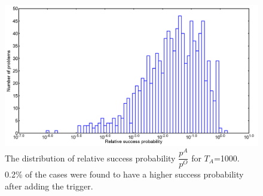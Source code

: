\documentclass[../main.tex]{subfiles}
\begin{document}
\begin{figure}[H]
\centering 
\includegraphics[scale=0.3]{A_T1000_g0.png}
\caption{The distribution of relative success probability $\dfrac{p^A}{p^O}$ for $T_A$=1000. 0.2\% of the cases were found to have a higher success probability after adding the trigger.}
\label{fig:a12}
\end{figure}
\end{document}
